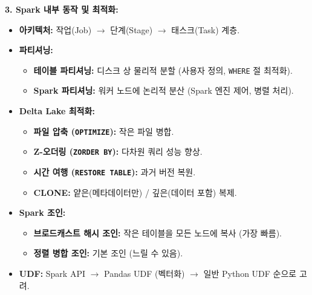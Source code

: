 \documentclass[11pt,a4paper]{article}
\theoremstyle{definition}
\begin{document}
\begin{tcolorbox}[colback=blue!5!white, colframe=blue!75!black, title=\textbf{CSCI103 Lecture 4: 데이터 변환 핵심 요약}]
\textbf{3. Spark 내부 동작 및 최적화:}
\begin{itemize}
    \item \textbf{아키텍처:} 작업(Job) $\rightarrow$ 단계(Stage) $\rightarrow$ 태스크(Task) 계층.
    \item \textbf{파티셔닝:}
    \begin{itemize}
        \item \textbf{테이블 파티셔닝:} 디스크 상 물리적 분할 (사용자 정의, \texttt{WHERE} 절 최적화).
        \item \textbf{Spark 파티셔닝:} 워커 노드에 논리적 분산 (Spark 엔진 제어, 병렬 처리).
    \end{itemize}
    \item \textbf{Delta Lake 최적화:}
    \begin{itemize}
        \item \textbf{파일 압축 (\texttt{OPTIMIZE}):} 작은 파일 병합.
        \item \textbf{Z-오더링 (\texttt{ZORDER BY}):} 다차원 쿼리 성능 향상.
        \item \textbf{시간 여행 (\texttt{RESTORE TABLE}):} 과거 버전 복원.
        \item \textbf{CLONE:} 얕은(메타데이터만) / 깊은(데이터 포함) 복제.
    \end{itemize}
    \item \textbf{Spark 조인:}
    \begin{itemize}
        \item \textbf{브로드캐스트 해시 조인:} 작은 테이블을 모든 노드에 복사 (가장 빠름).
        \item \textbf{정렬 병합 조인:} 기본 조인 (느릴 수 있음).
    \end{itemize}
    \item \textbf{UDF:} Spark API $\rightarrow$ Pandas UDF (벡터화) $\rightarrow$ 일반 Python UDF 순으로 고려.
\end{itemize}


\end{tcolorbox}
\end{document}
